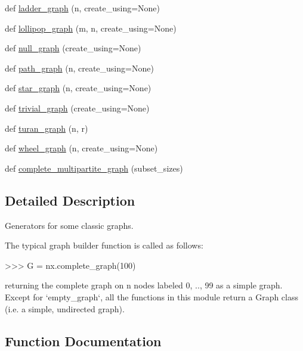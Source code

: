 \begin{DoxyCompactItemize}
\item 
def \hyperlink{namespacenetworkx_1_1generators_1_1classic_ab8cf6c6f6623688eb5ceda3a39eb11ec}{ladder\+\_\+graph} (n, create\+\_\+using=None)
\item 
def \hyperlink{namespacenetworkx_1_1generators_1_1classic_a8db7a0434f8dd414559287edd0a65957}{lollipop\+\_\+graph} (m, n, create\+\_\+using=None)
\item 
def \hyperlink{namespacenetworkx_1_1generators_1_1classic_a6a0556de2c6a97a6614334c0a5830644}{null\+\_\+graph} (create\+\_\+using=None)
\item 
def \hyperlink{namespacenetworkx_1_1generators_1_1classic_a52398ee63be385cd34c1a1cd523401b7}{path\+\_\+graph} (n, create\+\_\+using=None)
\item 
def \hyperlink{namespacenetworkx_1_1generators_1_1classic_a9922d057a8798f8b8856665f3effb75a}{star\+\_\+graph} (n, create\+\_\+using=None)
\item 
def \hyperlink{namespacenetworkx_1_1generators_1_1classic_a96b7963652c898ec831f49d688d5a7b3}{trivial\+\_\+graph} (create\+\_\+using=None)
\item 
def \hyperlink{namespacenetworkx_1_1generators_1_1classic_abfb69342a777ad423fd6247bd9752e6b}{turan\+\_\+graph} (n, r)
\item 
def \hyperlink{namespacenetworkx_1_1generators_1_1classic_ac26d38d589cb04117e9476e3b5d5d62d}{wheel\+\_\+graph} (n, create\+\_\+using=None)
\item 
def \hyperlink{namespacenetworkx_1_1generators_1_1classic_a40bf451199b8b14c3918b16b93f6fe11}{complete\+\_\+multipartite\+\_\+graph} (subset\+\_\+sizes)
\end{DoxyCompactItemize}


\subsection{Detailed Description}
\begin{DoxyVerb}Generators for some classic graphs.

The typical graph builder function is called as follows:

>>> G = nx.complete_graph(100)

returning the complete graph on n nodes labeled 0, .., 99
as a simple graph. Except for `empty_graph`, all the functions
in this module return a Graph class (i.e. a simple, undirected graph).\end{DoxyVerb}
 

\subsection{Function Documentation}
\mbox{\label{namespacenetworkx_1_1generators_1_1classic_ad756a1d5ee001098fc188872b847ceae}} 

